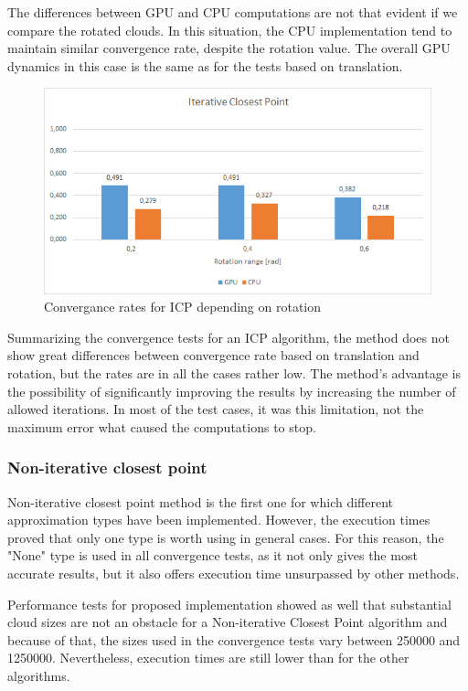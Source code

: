 \documentclass[titlepage]{article}
\begin{document}
The differences between GPU and CPU computations are not that evident if we compare the rotated clouds. In this situation, the CPU implementation tend to maintain similar convergence rate, despite the rotation value. The overall GPU dynamics in this case is the same as for the tests based on translation.
\begin{figure}[H]
\includegraphics[width=\textwidth]{ss-icp-3.png}
\caption{Convergance rates for ICP depending on rotation}
\end{figure}
Summarizing the convergence tests for an ICP algorithm, the method does not show great differences between convergence rate based on translation and rotation, but the rates are in all the cases rather low. The method's advantage is the possibility of significantly improving the results by increasing the number of allowed iterations. In most of the test cases, it was this limitation, not the maximum error what caused the computations to stop.

\subsubsection{Non-iterative closest point}
Non-iterative closest point method is the first one for which different approximation types have been implemented. However, the execution times proved that only one type is worth using in general cases. For this reason, the "None" type is used in all convergence tests, as it not only gives the most accurate results, but it also offers execution time unsurpassed by other methods.

Performance tests for proposed implementation showed as well that substantial cloud sizes are not an obstacle for a Non-iterative Closest Point algorithm and because of that, the sizes used in the convergence tests vary between 250000 and 1250000. Nevertheless, execution times are still lower than for the other algorithms.
\end{document}
